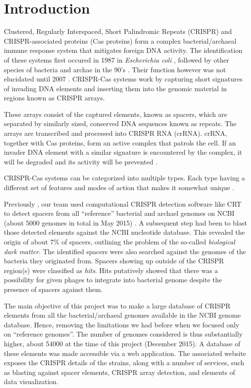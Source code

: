 \documentclass[11pt, a4paper,titlepage]{article}
\begin{document}


\section{Introduction}

Clustered, Regularly Interspaced, Short Palindromic Repeats (CRISPR)
and CRISPR-associated proteins (Cas proteins) form a complex
bacterial/archaeal immune response system that mitigates foreign DNA
activity. The identification of these systems first occured in 1987 in
\emph{Escherichia coli} \cite{nakata1989unusual}, followed by other
species of bacteria and archae in the 90's
\cite{mojica1995long}. Their function however was not elucidated until
2007 \cite{Barrangou23032007}. CRISPR-Cas systems work by capturing
short signatures of invading DNA elements and inserting them into the
genomic material in regions known as CRISPR arrays.

These arrays consist of the captured elements, known as spacers, which
are separated by similarly sized, conserved DNA sequences known as
repeats.  The arrays are transcribed and processed into CRISPR RNA
(crRNA). crRNA, together with Cas proteins, form an active complex
that patrols the cell. If an invader DNA element with a similar
signature is encountered by the complex, it will be degraded and its
activity will be prevented \cite{Horvath08012010}.

CRISPR-Cas systems can be categorized into multiple types. Each type
having a different set of features and modes of action that makes it
somewhat unique \cite{makarova2011evolution}.

Previously \cite{Omicians2015}, our team used computational CRISPR
detection software like CRT \cite{bland2007crispr} to detect spacers
from all ``reference'' bacterial and archael genomes on NCBI (about
5000 genomes in total in May 2015) . A subsequent step had been to
blast those detected elements against the NCBI nucleotide
database. This revealed the origin of about 7\% of spacers, outlining
the problem of the so-called \emph{biological dark matter}. The
identified spacers were also searched against the genomes of the
bacteria they originated from. Spacers showing up outside of the
CRISPR region(s) were classified as \emph{hits}. Hits putatively showed
that there was a possibility for given phages to integrate into
bacterial genome despite the presence of spacers against them.

The main objective of this project was to make a large database of
CRISPR elements from all the bacterial/archaeal genomes available in
the NCBI genome database. Hence, removing the limitations we had
before when we focused only on ``reference genomes''. The number of
genomes considered is thus substantially higher, about 54000 at the
time of this project (December 2015). A database of these elements was
made accessible via a web application. The associated website exposes
the CRISPR details of the strains, along with a number of services,
such as blasting against spacer elements, CRISPR array detection, and
elements of data visualization.
\end{document}
